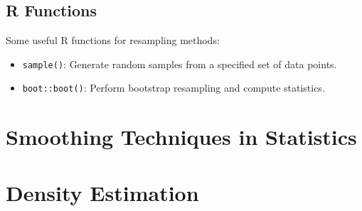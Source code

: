 \documentclass[
  letterpaper,
  DIV=11,
  numbers=noendperiod]{scrreprt}
\begin{document}
\begin{tcolorbox}
\section{R Functions}\label{r-functions}

Some useful R functions for resampling methods:

\begin{itemize}
\item
  \texttt{sample()}: Generate random samples from a specified set of
  data points.
\item
  \texttt{boot::boot()}: Perform bootstrap resampling and compute
  statistics.
\end{itemize}

\end{tcolorbox}


\chapter{Smoothing Techniques in
Statistics}\label{smoothing-techniques-in-statistics}

\newcommand{\E}{\mathbb E}
\newcommand{\R}{\mathbb{R}}
\newcommand{\var}{\mathbb{V}ar}
\newcommand{\bx}{\mathbf{x}}
\newcommand{\bX}{\mathbf{X}}
\newcommand{\cov}{\mathbb{C}ov}
\newcommand{\mse}{\mathrm{MSE}}
\newcommand{\corr}{\mathbb{C}orr}
\newcommand{\unif}{\operatorname{Unif}}
\newcommand{\geom}{\operatorname{Geom}}
\newcommand{\bet}{\operatorname{Beta}}
\newcommand{\bern}{\operatorname{Bern}}
\newcommand{\iid}{\overset{iid}{\sim}}
\newcommand{\ef}{\operatorname{Eff}}
\newcommand{\htt}{\hat \theta}
\newcommand{\b}{\mathbb b}


\chapter{Density Estimation}\label{density-estimation}

\newcommand{\E}{\mathbb E}
\newcommand{\R}{\mathbb{R}}
\newcommand{\var}{\mathbb{V}ar}
\newcommand{\bx}{\mathbf{x}}
\newcommand{\bX}{\mathbf{X}}
\newcommand{\cov}{\mathbb{C}ov}
\newcommand{\mse}{\mathrm{MSE}}
\newcommand{\corr}{\mathbb{C}orr}
\newcommand{\unif}{\operatorname{Unif}}
\newcommand{\geom}{\operatorname{Geom}}
\newcommand{\bet}{\operatorname{Beta}}
\newcommand{\bern}{\operatorname{Bern}}
\newcommand{\iid}{\overset{iid}{\sim}}
\newcommand{\ef}{\operatorname{Eff}}
\newcommand{\htt}{\hat \theta}
\newcommand{\b}{\mathbb b}
\end{document}
